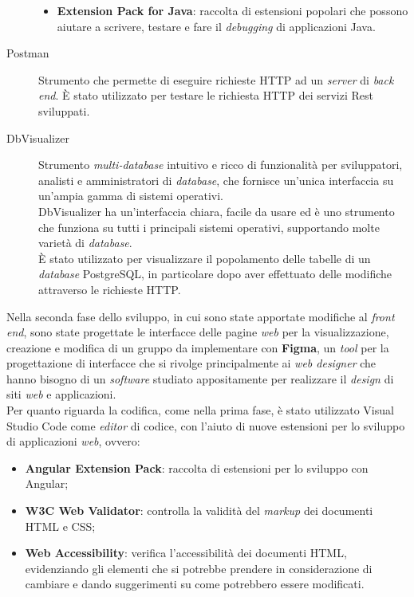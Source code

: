 \begin{description}
\begin{itemize}
                  \item \textbf{Extension Pack for Java}: raccolta di
                        estensioni popolari
                        che possono aiutare a scrivere, testare e fare il
                        \textit{debugging} di applicazioni Java.
            \end{itemize}
      \item[Postman]
            Strumento che permette di eseguire richieste HTTP ad un
            \textit{server} di \textit{back end}. È stato utilizzato per
            testare le richiesta HTTP dei servizi Rest sviluppati.
      \item[DbVisualizer] Strumento \textit{multi-database} intuitivo e ricco
            di
            funzionalità per sviluppatori, analisti e amministratori di
            \textit{database},
            che fornisce un'unica interfaccia su un'ampia gamma di
            sistemi
            operativi. \\
            DbVisualizer ha un'interfaccia chiara, facile da usare ed è uno
            strumento
            che
            funziona su tutti i principali sistemi operativi, supportando molte
            varietà di
            \textit{database}. \\
            È stato utilizzato per visualizzare il popolamento delle tabelle
            di un \textit{database} PostgreSQL, in particolare dopo aver
            effettuato delle modifiche attraverso le richieste HTTP.
\end{description}

\noindent Nella seconda fase dello sviluppo, in cui sono state apportate
modifiche al
\textit{front end}, sono state progettate le interfacce delle pagine
\textit{web} per la visualizzazione, creazione e modifica di un gruppo da
implementare con \textbf{Figma}, un \textit{tool} per la progettazione di
interfacce che si rivolge principalmente ai \textit{web designer} che hanno
bisogno di un
\textit{software} studiato appositamente per realizzare il \textit{design} di
siti \textit{web} e applicazioni.\\

\noindent Per quanto riguarda la codifica, come nella prima fase, è stato
utilizzato Visual Studio
Code come \textit{editor} di codice, con l'aiuto di nuove estensioni per lo
sviluppo di applicazioni \textit{web}, ovvero:
\begin{itemize}
      \item \textbf{Angular Extension Pack}: raccolta di
            estensioni per lo sviluppo con Angular;
      \item \textbf{W3C Web Validator}: controlla la validità del
            \textit{markup} dei documenti HTML e CSS;
      \item \textbf{Web Accessibility}: verifica l'accessibilità
            dei documenti HTML, evidenziando gli elementi che si
            potrebbe prendere in considerazione di cambiare e dando
            suggerimenti su come potrebbero essere modificati.
\end{itemize}

